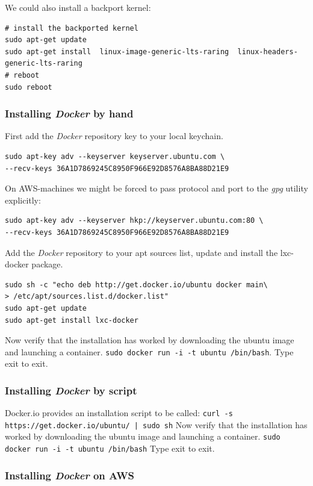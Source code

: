 \documentclass[captions=tableheading]{article}
\begin{document}
We could also install a backport kernel:

\begin{verbatim}
# install the backported kernel
sudo apt-get update
sudo apt-get install  linux-image-generic-lts-raring  linux-headers-generic-lts-raring
# reboot
sudo reboot
\end{verbatim}
\subsubsection{Installing \emph{Docker} by hand}
\label{sec-2-1-2}

First add the \emph{Docker} repository key to your local keychain.

\begin{verbatim}
sudo apt-key adv --keyserver keyserver.ubuntu.com \
--recv-keys 36A1D7869245C8950F966E92D8576A8BA88D21E9
\end{verbatim}
On AWS-machines we might be forced to pass protocol and port to the \emph{gpg} utility explicitly: 

\begin{verbatim}
sudo apt-key adv --keyserver hkp://keyserver.ubuntu.com:80 \
--recv-keys 36A1D7869245C8950F966E92D8576A8BA88D21E9
\end{verbatim}

Add the \emph{Docker} repository to your apt sources list, update and install
the lxc-docker package. 
 

\begin{verbatim}
sudo sh -c "echo deb http://get.docker.io/ubuntu docker main\
> /etc/apt/sources.list.d/docker.list"
sudo apt-get update
sudo apt-get install lxc-docker
\end{verbatim}
Now verify that the installation has worked by downloading the ubuntu
image and launching a container. \texttt{sudo docker run -i -t ubuntu /bin/bash}.
Type exit to exit.
\subsubsection{Installing \emph{Docker} by script}
\label{sec-2-1-3}

Docker.io provides an installation script to be called: \texttt{curl -s https://get.docker.io/ubuntu/ | sudo sh}
Now verify that the installation has worked by downloading the ubuntu
image and launching a container. \texttt{sudo docker run -i -t ubuntu /bin/bash}
Type exit to exit.
\subsubsection{Installing \emph{Docker}  on AWS}
\label{sec-2-1-4}
\end{document}

